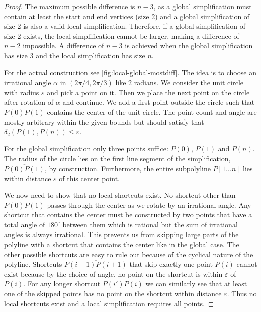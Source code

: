 \begin{proof}
	The maximum possible difference is \(n-3\), as a global simplification must contain at least the start and end vertices (size 2) and a global simplification of size 2 is also a valid local simplification. Therefore, if a global simplification of size 2 exists, the local simplification cannot be larger, making a difference of \(n-2\) impossible. A difference of \(n-3\) is achieved when the global simplification has size \(3\) and the local simplification has size \(n\).

	For the actual construction see \cref{fig:local-global-mostdiff}. The idea is to choose an irrational angle \(\alpha\) in \((2\pi/4, 2\pi/3)\) like \(2\) radians. We consider the unit circle with radius \(\varepsilon\) and pick a point on it. Then we place the next point on the circle after rotation of \(\alpha\) and continue. We add a first point outside the circle such that \(\overline{P(0)P(1)}\) contains the center of the unit circle. The point count and angle are mostly arbitrary within the given bounds but should satisfy that \(\delta_2(P(1), P(n)) \leq \varepsilon\).

	For the global simplification only three points suffice: \(P(0)\), \(P(1)\) and \(P(n)\). The radius of the circle lies on the first line segment of the simplification, \(\overline{P(0)P(1)}\), by construction. Furthermore, the entire subpolyline \(P[1 \dots n]\) lies within distance \(\varepsilon\) of this center point.

	We now need to show that no local shortcuts exist. No shortcut other than \(\overline{P(0)P(1)}\) passes through the center as we rotate by an irrational angle. Any shortcut that contains the center must be constructed by two points that have a total angle of \(180^\circ\) between them which is rational but the sum of irrational angles is always irrational. This prevents us from skipping large parts of the polyline with a shortcut that contains the center like in the global case. The other possible shortcuts are easy to rule out because of the cyclical nature of the polyline. Shortcuts \(\overline{P(i-1)P(i+1)}\) that skip exactly one point \(P(i)\) cannot exist because by the choice of angle, no point on the shortcut is within \(\varepsilon\) of \(P(i)\). For any longer shortcut \(\overline{P(i')P(i)}\) we can similarly see that at least one of the skipped points has no point on the shortcut within distance \(\varepsilon\). Thus no local shortcuts exist and a local simplification requires all points.
\end{proof}

